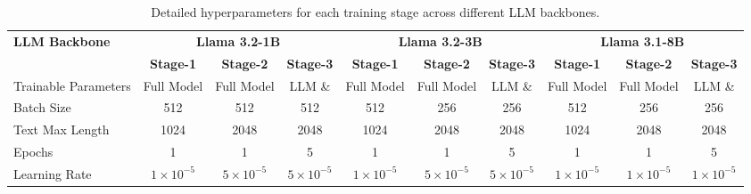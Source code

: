 

\begin{table}[hb]
\centering
\caption{Detailed hyperparameters for each training stage across different LLM backbones.}
\label{tab:hyperparams}
\begin{adjustbox}{width=\textwidth}
\begin{tabular}{l|ccc|ccc|ccc}
\toprule
\textbf{LLM Backbone} & \multicolumn{3}{c|}{\textbf{Llama 3.2-1B}} & \multicolumn{3}{c|}{\textbf{Llama 3.2-3B}} & \multicolumn{3}{c}{\textbf{Llama 3.1-8B}} \\ 
\cmidrule(lr){2-4} \cmidrule(lr){5-7} \cmidrule(lr){8-10} 
                   & \textbf{Stage-1} & \textbf{Stage-2} & \textbf{Stage-3} & \textbf{Stage-1} & \textbf{Stage-2} & \textbf{Stage-3} & \textbf{Stage-1} & \textbf{Stage-2} & \textbf{Stage-3} \\ 
\midrule
Trainable Parameters & Full Model  & Full Model & LLM \& \alignmodule{} & Full Model  & Full Model & LLM \& \alignmodule{} & Full Model  & Full Model & LLM \& \alignmodule{} \\
Batch Size           & 512           & 512           & 512           & 512           & 256           & 256           & 512           & 256           & 256          \\
Text Max Length     & 1024          & 2048          & 2048         & 1024          & 2048          & 2048          & 1024          & 2048          & 2048          \\
Epochs                & 1             & 1             & 5             & 1             & 1             & 5             & 1             & 1             & 5             \\
Learning Rate & $1\times10^{-5}$ & $5\times10^{-5}$ & $5\times10^{-5}$ & $1\times10^{-5}$ & $5\times10^{-5}$ & $5\times10^{-5}$ & $1\times10^{-5}$ & $1\times10^{-5}$ & $1\times10^{-5}$ \\
\bottomrule
\end{tabular}
\end{adjustbox}
\end{table}
